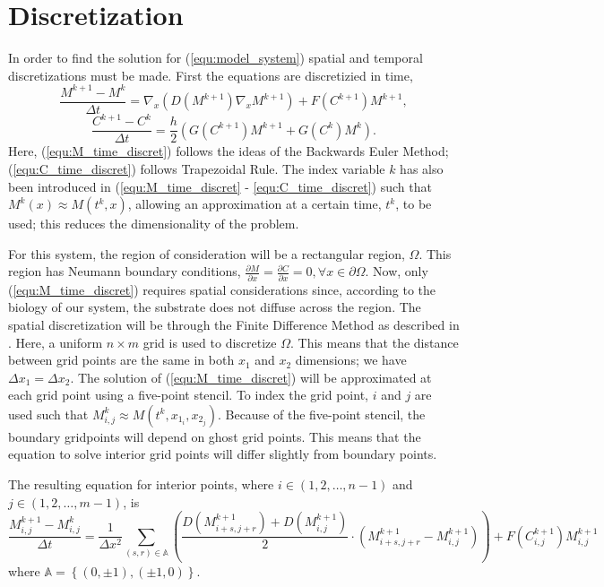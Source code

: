 \section{Discretization}

In order to find the solution for (\ref{equ:model_system}) spatial and temporal discretizations must be made.
First the equations are discretizied in time, 
\begin{equation} \label{equ:M_time_discret}
  \frac{M^{k+1} - M^{k}}{\Delta t} = \nabla_x (D(M^{k+1}) \nabla_x M^{k+1}) + F(C^{k+1}) M^{k+1},
\end{equation}
\begin{equation} \label{equ:C_time_discret}
  \frac{C^{k+1} - C^{k}}{\Delta t} = \frac{h}{2} ( G(C^{k+1}) M^{k+1} + G(C^{k}) M^{k} ).
\end{equation}
Here, (\ref{equ:M_time_discret}) follows the ideas of the Backwards Euler Method; (\ref{equ:C_time_discret}) follows Trapezoidal Rule. 
The index variable $k$ has also been introduced in (\ref{equ:M_time_discret} - \ref{equ:C_time_discret}) such that $M^{k}(x) \approx M(t^{k}, x)$, allowing an approximation at a certain time, $t^{k}$, to be used; this reduces the dimensionality of the problem. 

For this system, the region of consideration will be a rectangular region, $\Omega$.
This region has Neumann boundary conditions, $\frac{\partial M}{\partial x} = \frac{\partial C}{\partial x} = 0, \forall x \in \partial \Omega$.
Now, only (\ref{equ:M_time_discret}) requires spatial considerations since, according to the biology of our system, the substrate does not diffuse across the region.
The spatial discretization will be through the Finite Difference Method as described in \cite{saad2003iterativeMethod}.
Here, a uniform $n \times m$ grid is used to discretize $\Omega$.
This means that the distance between grid points are the same in both $x_1$ and $x_2$ dimensions; we have $\Delta x_1 = \Delta x_2$.
The solution of (\ref{equ:M_time_discret}) will be approximated at each grid point using a five-point stencil. 
To index the grid point, $i$ and $j$ are used such that $M^{k}_{i,j} \approx M(t^{k}, x_{1_i}, x_{2_j})$.
Because of the five-point stencil, the boundary gridpoints will depend on ghost grid points.
This means that the equation to solve interior grid points will differ slightly from boundary points.

The resulting equation for interior points, where $i \in (1, 2, \ldots, n-1)$ and $j \in (1, 2, \ldots, m-1)$, is
\begin{equation} \label{equ:M_space_discret}
  \frac{M^{k+1}_{i,j} - M^{k}_{i,j}}{\Delta t} = 
    \frac{1}{\Delta x^2} \sum_{(s,r) \in \mathbb{A}} 
    \left( \frac{D(M^{k+1}_{i+s,j+r}) + D(M^{k+1}_{i,j})}{2} 
    \cdot ( M^{k+1}_{i+s, j+r} - M^{k+1}_{i,j}) \right) 
    + F(C^{k+1}_{i,j}) M^{k+1}_{i,j}
\end{equation}
where $\mathbb{A} = \left\{ (0, \pm1), (\pm1, 0) \right\}$.

